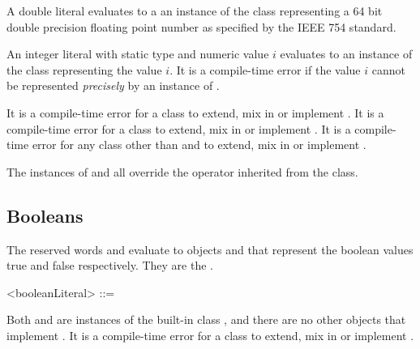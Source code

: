 \documentclass[makeidx]{article}
\begin{document}
{\LMHash{}%
A double literal evaluates to a an instance of the  class
representing a 64 bit double precision floating point number
as specified by the IEEE 754 standard.

\LMHash{}%
An integer literal with static type  and numeric value $i$
evaluates to an instance of the  class representing the value $i$.
It is a compile-time error if the value $i$
cannot be represented \emph{precisely} by an instance of .


\LMHash{}%
It is a compile-time error for a class to extend, mix in or implement
.
It is a compile-time error for a class to extend, mix in or implement
.
It is a compile-time error for any class
other than  and  to extend, mix in or implement
.

\LMHash{}%
The instances of  and  all override
the \lit{==} operator inherited from the  class.


\subsection{Booleans}

\LMHash{}%
The reserved words \TRUE{} and \FALSE{} evaluate to objects
 and
that represent the boolean values true and false respectively.
They are the .

\begin{grammar}
<booleanLiteral> ::= \TRUE{}
  \alt \FALSE{}
\end{grammar}

\LMHash{}%
Both  and  are instances of
the built-in class ,
and there are no other objects that implement .
It is a compile-time error for a class to
extend, mix in or implement .


}
\end{document}
